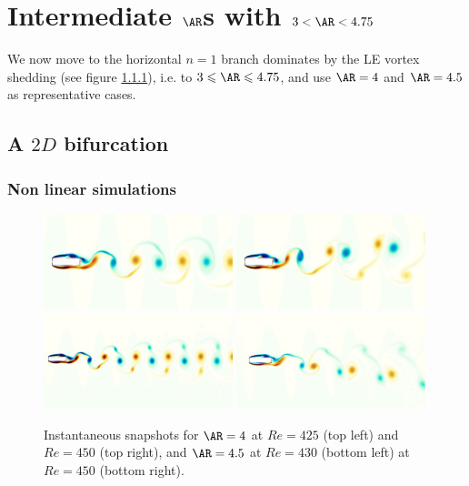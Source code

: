 \section{Intermediate $\AR$s with $3 < \AR < 4.75$}

We now move to the horizontal $n=1$ branch dominates by the LE vortex shedding (see figure \ref{}), i.e. to $3 \le \AR \le 4.75$, and use $\AR=4$ and $\AR=4.5$ as representative cases.

\subsection{A $2D$ bifurcation}

\subsubsection{Non linear simulations}

\begin{figure}
  \centering
  \includegraphics[trim={0 100 0 100},clip,width=0.49\textwidth]{./fig/vort_Re425_25.png}
  \includegraphics[trim={0 100 0 100},clip,width=0.49\textwidth]{./fig/vort_Re450_25.png}  
  \includegraphics[trim={0 100 0 100},clip,width=0.49\textwidth]{./fig/AR4p5/vort_Re430_25.png}
  \includegraphics[trim={0 100 0 100},clip,width=0.49\textwidth]{./fig/AR4p5/vort_Re450_25.png}
  \caption{Instantaneous snapshots for $\AR=4$ at $Re=425$ (top left) and $Re=450$ (top right), and $\AR=4.5$ at $Re=430$ (bottom left) at $Re=450$ (bottom right).}
  \label{fig:snap_ar4_ar4p5}
\end{figure}

